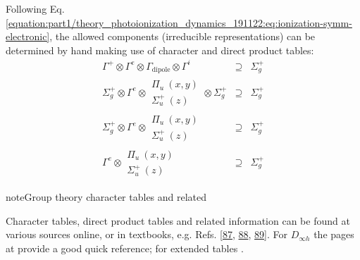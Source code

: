\documentclass[letterpaper,table,10pt,english]{jupyterBook}
\begin{document}
\sphinxAtStartPar
Following Eq. \eqref{equation:part1/theory_photoionization_dynamics_191122:eq:ionization-symm-electronic}, the allowed components (irreducible representations) can be determined by hand making use of character and direct product tables:
\label{equation:part2/sym-fitting-intro_220423:f7afdd14-c875-4a59-8c68-cc2912527c9e}\begin{eqnarray}
\Gamma^{+}\otimes\Gamma^{e}\otimes\Gamma_{\mathrm{dipole}}\otimes\Gamma^{i} & \supseteq & \Sigma_{g}^{+}\\
\Sigma_{g}^{+}\otimes\Gamma^{e}\otimes\begin{array}{c}
\Pi_{u}~(x,y)\\
\Sigma_{u}^{+}~(z)
\end{array}\otimes\Sigma_{g}^{+} & \supseteq & \Sigma_{g}^{+}\\
\Sigma_{g}^{+}\otimes\Gamma^{e}\otimes\begin{array}{c}
\Pi_{u}~(x,y)\\
\Sigma_{u}^{+}~(z)
\end{array} & \supseteq & \Sigma_{g}^{+}\\
\Gamma^{e}\otimes\begin{array}{c}
\Pi_{u}~(x,y)\\
\Sigma_{u}^{+}~(z)
\end{array} & \supseteq & \Sigma_{g}^{+}
\end{eqnarray}
\begin{sphinxadmonition}{note}{Group theory character tables and related}

\sphinxAtStartPar
Character tables, direct product tables and related information can be found at various sources online, or in textbooks, e.g. Refs. {[}\hyperlink{cite.backmatter/bibliography:id460}{87}, \hyperlink{cite.backmatter/bibliography:id564}{88}, \hyperlink{cite.backmatter/bibliography:id648}{89}{]}. For \(D_{\infty h}\) the pages at  provide a good quick reference; for extended tables .
\end{sphinxadmonition}
\end{document}
